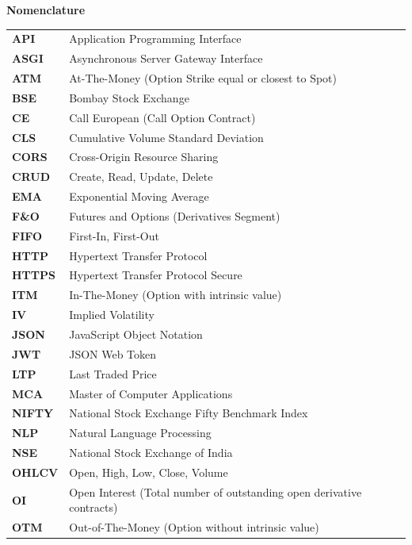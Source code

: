 \begin{center}
{\LARGE \textbf{Nomenclature}}\\[1.5cm]
\end{center}

\noindent
\begin{longtable}{@{}p{3.0cm}p{11.5cm}@{}}
\textbf{API} & Application Programming Interface \\
\textbf{ASGI} & Asynchronous Server Gateway Interface \\
\textbf{ATM} & At-The-Money (Option Strike equal or closest to Spot) \\
\textbf{BSE} & Bombay Stock Exchange \\
\textbf{CE} & Call European (Call Option Contract) \\
\textbf{CLS} & Cumulative Volume Standard Deviation \\
\textbf{CORS} & Cross-Origin Resource Sharing \\
\textbf{CRUD} & Create, Read, Update, Delete \\
\textbf{EMA} & Exponential Moving Average \\
\textbf{F\&O} & Futures and Options (Derivatives Segment) \\
\textbf{FIFO} & First-In, First-Out \\
\textbf{HTTP} & Hypertext Transfer Protocol \\
\textbf{HTTPS} & Hypertext Transfer Protocol Secure \\
\textbf{ITM} & In-The-Money (Option with intrinsic value) \\
\textbf{IV} & Implied Volatility \\
\textbf{JSON} & JavaScript Object Notation \\
\textbf{JWT} & JSON Web Token \\
\textbf{LTP} & Last Traded Price \\
\textbf{MCA} & Master of Computer Applications \\
\textbf{NIFTY} & National Stock Exchange Fifty Benchmark Index \\
\textbf{NLP} & Natural Language Processing \\
\textbf{NSE} & National Stock Exchange of India \\
\textbf{OHLCV} & Open, High, Low, Close, Volume \\
\textbf{OI} & Open Interest (Total number of outstanding open derivative contracts) \\
\textbf{OTM} & Out-of-The-Money (Option without intrinsic value) \\

\end{longtable}
